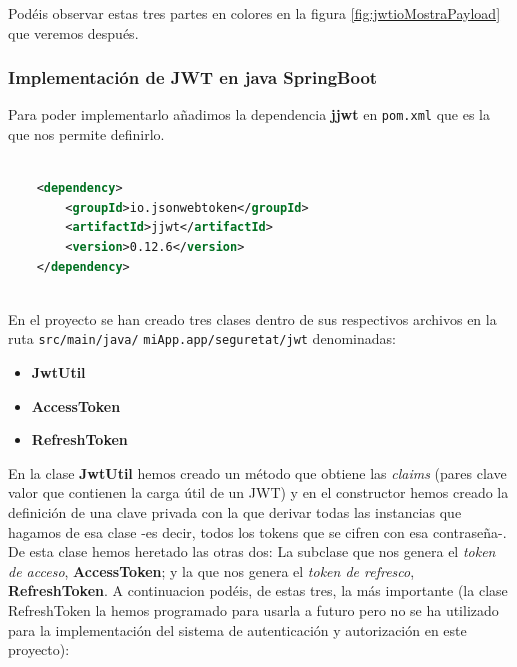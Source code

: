 \documentclass[a4paper,12pt]{report}
\begin{document}
				Podéis observar estas tres partes en colores en la figura \ref{fig:jwtioMostraPayload} que veremos después.
				
				
				

				

				
				
				\subsubsection{Implementación de JWT en java SpringBoot}
				\label{sec:implementacionJWTjava}
				Para poder implementarlo añadimos la dependencia \textbf{jjwt} en \texttt{pom.xml} que es la que nos permite definirlo.
				
				
				\begin{lstlisting}[language=XML, basicstyle=\ttfamily\small, keywordstyle=\color{red}]
					
	<dependency>
		<groupId>io.jsonwebtoken</groupId>
		<artifactId>jjwt</artifactId>
		<version>0.12.6</version>
	</dependency>
					
				\end{lstlisting}
				
				
		En el proyecto se han creado tres clases dentro de sus respectivos archivos en la ruta \texttt{src/main/java/} \texttt{miApp.app/seguretat/jwt} denominadas:
		
		\begin{itemize}
			\setlength{\itemsep}{-.4em}
			\item \textbf{JwtUtil}
			\item \textbf{AccessToken}
			\item \textbf{RefreshToken}
		\end{itemize}
		  
		
		En la clase \textbf{JwtUtil} hemos creado un método que obtiene las \textit{claims} (pares clave valor que contienen la carga útil de un JWT) y en el constructor hemos creado la definición de una clave privada con la que derivar todas las instancias que hagamos de esa clase -es decir, todos los tokens que se cifren con esa contraseña-. De esta clase hemos heretado las otras dos: La subclase que nos genera el \textit{token de acceso}, \textbf{AccessToken}; y la que nos genera el \textit{token de refresco}, \textbf{RefreshToken}. A continuacion podéis, de estas tres, la más importante (la clase RefreshToken la hemos programado para usarla a futuro pero no se ha utilizado para la implementación del sistema de autenticación y autorización en este proyecto): 
		
\end{document}
